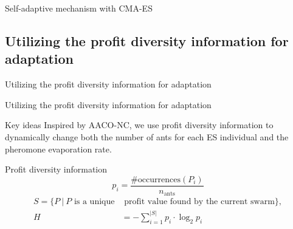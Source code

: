 \documentclass[aspectratio=169]{beamer}
\begin{document}
\begin{frame}{Self-adaptive mechanism with CMA-ES}
    \vspace{0.1cm}
    \centering
    
\end{frame}


\subsection{Utilizing the profit diversity information for adaptation}
\begin{frame}{Utilizing the profit diversity information for adaptation}
    \vspace{0.1cm}
    \centering
    
\end{frame}

\begin{frame}{Utilizing the profit diversity information for adaptation}
    \begin{block}{Key ideas}
        Inspired by AACO-NC\footnotemark, we use profit diversity information to dynamically change both the number of ants for each ES individual and the pheromone evaporation rate.
        \vspace{0.1cm}
    \end{block}
    \begin{block}{Profit diversity information}
        \begin{equation}\label{eq:entropy_prob}
            p_{i} = \frac{\text{\#occurrences}(P_{i})}{n_{\text{ants}}}
        \end{equation}
        \begin{equation}\label{eq:entropy}
            \begin{split}
                S = \{P\  |\ \text{$P$ is a unique}&\text{ profit value found by the current swarm}\} ,\\
                H &= -\sum_{i=1}^{|S|} p_{i} \cdot \log_2 p_{i}
            \end{split}
        \end{equation}
    \end{block}
\end{frame}
\end{document}
